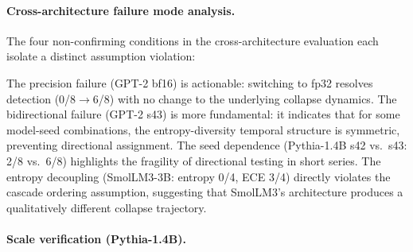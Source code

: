 \paragraph{Cross-architecture failure mode analysis.}
The four non-confirming conditions in the cross-architecture evaluation each isolate a distinct assumption violation:

\begin{table}[t]
\centering
\small
\caption{Failure mode taxonomy for non-confirming cross-architecture conditions ($\alpha{=}1.0$).}
\label{tab:failure_modes}
\end{table}

The precision failure (GPT-2 bf16) is actionable: switching to fp32 resolves detection (0/8$\to$6/8) with no change to the underlying collapse dynamics.
The bidirectional failure (GPT-2 s43) is more fundamental: it indicates that for some model-seed combinations, the entropy-diversity temporal structure is symmetric, preventing directional assignment.
The seed dependence (Pythia-1.4B s42 vs.\ s43: 2/8 vs.\ 6/8) highlights the fragility of directional testing in short series.
The entropy decoupling (SmolLM3-3B: entropy 0/4, ECE 3/4) directly violates the cascade ordering assumption, suggesting that SmolLM3's architecture produces a qualitatively different collapse trajectory.

\paragraph{Scale verification (Pythia-1.4B).}
\label{app:scale_14b}

